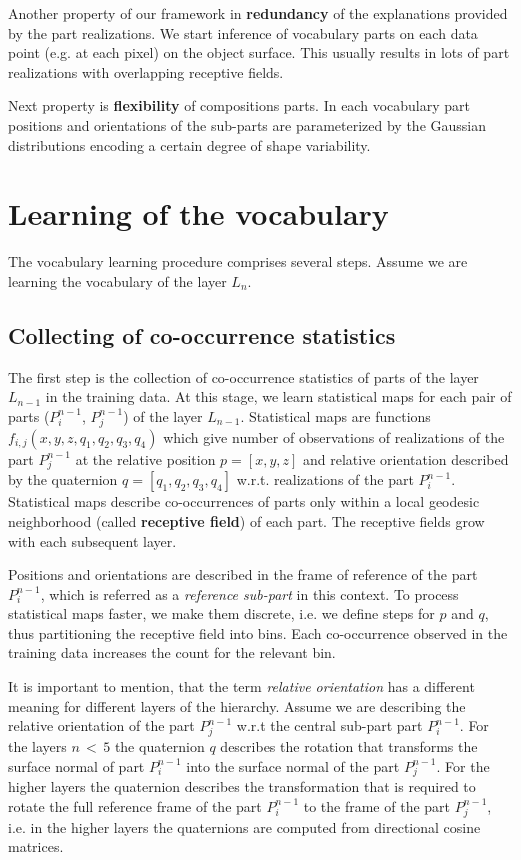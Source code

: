 \documentclass[runningheads]{llncs}
\begin{document}
Another property of our framework in \textbf{redundancy} of the
explanations provided by the part realizations. We start inference
of vocabulary parts on each data point (e.g. at each pixel) on the
object surface. This usually results in lots of part realizations
with overlapping receptive fields.

Next property is \textbf{flexibility} of compositions parts. In each
vocabulary part positions and orientations of the sub-parts are
parameterized by the Gaussian distributions encoding a certain
degree of shape variability.


\section{Learning of the vocabulary\label{sec:Learning}}

The vocabulary learning procedure comprises several steps. Assume we
are learning the vocabulary of the layer $L_n$.

\subsection{Collecting of co-occurrence statistics\label{sec:Collection}}
    The first step is the collection of co-occurrence statistics of parts of the layer $L_{n-1}$ in the training data. At
    this stage, we learn statistical maps for each pair of parts ($P_i^{n-1}$, $P_j^{n-1}$) of the layer
    $L_{n-1}$. Statistical maps are functions $f_{i,j}(x,y,z,q_1,q_2,q_3,q_4)$ which give number of observations of realizations of the part
    $P_j^{n-1}$ at the relative position $p = [x,y,z]$ and relative orientation described
    by the quaternion $q = [q_1,q_2,q_3,q_4]$ w.r.t. realizations of the part
    $P_i^{n-1}$. Statistical maps describe co-occurrences of parts only within a local geodesic neighborhood (called \textbf{receptive
    field}) of each part. The receptive fields grow with each subsequent
    layer.

    Positions and orientations are described in the frame of reference
    of the part $P_i^{n-1}$, which is referred as a \emph{reference sub-part}
    in this context. To process statistical maps faster, we make them discrete, i.e. we define steps
    for $p$ and $q$, thus partitioning the receptive field into
    bins. Each co-occurrence observed in the training
    data increases the count for the relevant bin.

    It is important to mention, that the term \emph{relative orientation}
    has a different meaning for different layers of the hierarchy. Assume
    we are describing the relative orientation of the part $P_j^{n-1}$ w.r.t the central sub-part
    part $P_i^{n-1}$. For the layers $n\,{<}\,5$ the quaternion $q$ describes
    the rotation that transforms the surface normal of part $P_i^{n-1}$ into the surface normal
    of the part $P_j^{n-1}$. For the higher layers the quaternion
    describes the
    transformation that is required to rotate the full reference frame of the part $P_i^{n-1}$ to the
    frame of the part $P_j^{n-1}$, i.e. in the higher layers the quaternions are computed from
    directional cosine matrices.
\end{document}
